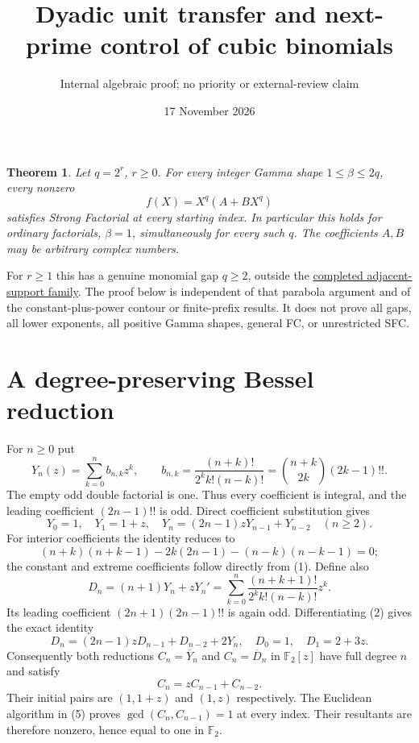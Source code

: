 \documentclass[11pt]{article}
\title{Dyadic unit transfer and next-prime control of cubic binomials}
\author{Internal algebraic proof; no priority or external-review claim}
\date{17 November 2026}
\newtheorem{theorem}{Theorem}
\begin{document}
\maketitle
\begin{theorem}\label{thm:main}
Let $q=2^r$, $r\ge0$. For every integer Gamma shape
$1\le\beta\le2q$, every nonzero
\[
                         f(X)=X^q(A+BX^q)
\]
satisfies Strong Factorial at every starting index. In particular this
holds for ordinary factorials, $\beta=1$, simultaneously for every such
$q$. The coefficients $A,B$ may be arbitrary complex numbers.
\end{theorem}
For $r\ge1$ this has a genuine monomial gap $q\ge2$, outside the
\href{UNIFORM_PADE_PARABOLA_SFC.tex}{completed adjacent-support family}.
The proof below is independent of that parabola argument and of the
constant-plus-power contour or finite-prefix results. It does not prove
all gaps, all lower exponents, all positive Gamma shapes, general FC,
or unrestricted SFC.

\section{A degree-preserving Bessel reduction}
For $n\ge0$ put
\[
 Y_n(z)=\sum_{k=0}^n b_{n,k}z^k,\qquad
 b_{n,k}=\frac{(n+k)!}{2^k k!(n-k)!}
       =\binom{n+k}{2k}(2k-1)!! .                           \tag{1}
\]
The empty odd double factorial is one. Thus every coefficient is integral,
and the leading coefficient $(2n-1)!!$ is odd. Direct coefficient
substitution gives
\[
 Y_0=1,\quad Y_1=1+z,\quad
 Y_n=(2n-1)zY_{n-1}+Y_{n-2}\quad(n\ge2).                  \tag{2}
\]
For interior coefficients the identity reduces to
\[
 (n+k)(n+k-1)-2k(2n-1)-(n-k)(n-k-1)=0;
\]
the constant and extreme coefficients follow directly from (1).
Define also
\[
 D_n=(n+1)Y_n+zY_n'
     =\sum_{k=0}^n\frac{(n+k+1)!}{2^k k!(n-k)!}z^k.        \tag{3}
\]
Its leading coefficient $(2n+1)(2n-1)!!$ is again odd. Differentiating
(2) gives the exact identity
\[
 D_n=(2n-1)zD_{n-1}+D_{n-2}+2Y_n,\quad D_0=1,
                         \quad D_1=2+3z.                 \tag{4}
\]
Consequently both reductions $C_n=\overline Y_n$ and
$C_n=\overline D_n$ in $\mathbb F_2[z]$ have full degree $n$ and satisfy
\[
                        C_n=zC_{n-1}+C_{n-2}.             \tag{5}
\]
Their initial pairs are $(1,1+z)$ and $(1,z)$ respectively.
The Euclidean algorithm in (5) proves
$\gcd(C_n,C_{n-1})=1$ at every index. Their resultants are therefore
nonzero, hence equal to one in $\mathbb F_2$.
\end{document}

